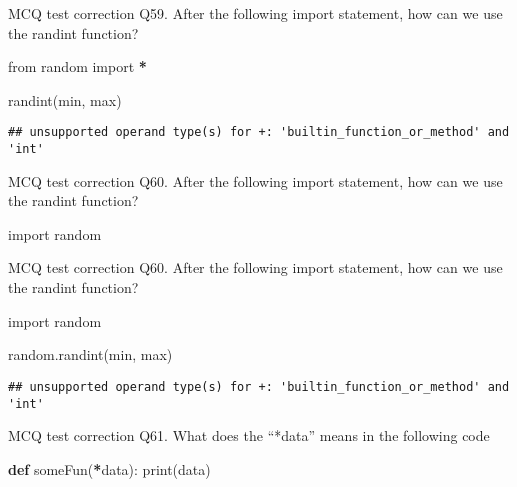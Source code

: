 \documentclass[
  8pt,
  ignorenonframetext,
]{beamer}
\newenvironment{Shaded}{\begin{snugshade}}{\end{snugshade}}
\newcommand{\BuiltInTok}[1]{#1}
\newcommand{\ImportTok}[1]{#1}
\newcommand{\KeywordTok}[1]{\textcolor[rgb]{0.13,0.29,0.53}{\textbf{#1}}}
\newcommand{\NormalTok}[1]{#1}
\newcommand{\OperatorTok}[1]{\textcolor[rgb]{0.81,0.36,0.00}{\textbf{#1}}}
\begin{document}
\begin{frame}[fragile]{MCQ test correction}
\protect\hypertarget{mcq-test-correction-117}{}
Q59. After the following import statement, how can we use the randint
function?

\begin{Shaded}
\begin{Highlighting}[]
\ImportTok{from}\NormalTok{ random }\ImportTok{import} \OperatorTok{*}

\NormalTok{randint(}\BuiltInTok{min}\NormalTok{, }\BuiltInTok{max}\NormalTok{)}
\end{Highlighting}
\end{Shaded}

\begin{verbatim}
## unsupported operand type(s) for +: 'builtin_function_or_method' and 'int'
\end{verbatim}
\end{frame}

\begin{frame}[fragile]{MCQ test correction}
\protect\hypertarget{mcq-test-correction-118}{}
Q60. After the following import statement, how can we use the randint
function?

\begin{Shaded}
\begin{Highlighting}[]
\ImportTok{import}\NormalTok{ random}
\end{Highlighting}
\end{Shaded}
\end{frame}

\begin{frame}[fragile]{MCQ test correction}
\protect\hypertarget{mcq-test-correction-119}{}
Q60. After the following import statement, how can we use the randint
function?

\begin{Shaded}
\begin{Highlighting}[]
\ImportTok{import}\NormalTok{ random}

\NormalTok{random.randint(}\BuiltInTok{min}\NormalTok{, }\BuiltInTok{max}\NormalTok{)}
\end{Highlighting}
\end{Shaded}

\begin{verbatim}
## unsupported operand type(s) for +: 'builtin_function_or_method' and 'int'
\end{verbatim}
\end{frame}

\begin{frame}[fragile]{MCQ test correction}
\protect\hypertarget{mcq-test-correction-120}{}
Q61. What does the ``*data'' means in the following code

\begin{Shaded}
\begin{Highlighting}[]
\KeywordTok{def}\NormalTok{ someFun(}\OperatorTok{*}\NormalTok{data):}
    \BuiltInTok{print}\NormalTok{(data)}
\end{Highlighting}
\end{Shaded}
\end{frame}
\end{document}
